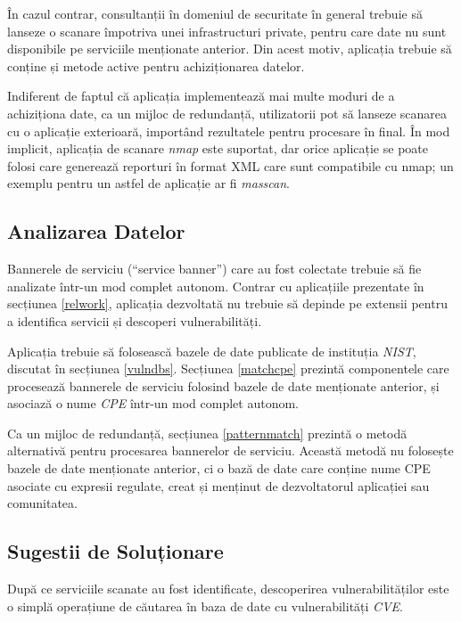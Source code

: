 	În cazul contrar, consultanții în domeniul de securitate în general trebuie să lanseze o scanare împotriva unei infrastructuri private, pentru care date nu sunt disponibile pe serviciile menționate anterior. Din acest motiv, aplicația trebuie să conține și metode active pentru achiziționarea datelor.
	
	Indiferent de faptul că aplicația implementează mai multe moduri de a achiziționa date, ca un mijloc de redundanță, utilizatorii pot să lanseze scanarea cu o aplicație exterioară, importând rezultatele pentru procesare în final. În mod implicit, aplicația de scanare \textit{nmap} este suportat, dar orice aplicație se poate folosi care generează reporturi în format XML care sunt compatibile cu nmap; un exemplu pentru un astfel de aplicație ar fi \textit{masscan}.

\subsection*{Analizarea Datelor}

	Bannerele de serviciu (``service banner'') care au fost colectate trebuie să fie analizate într-un mod complet autonom. Contrar cu aplicațiile prezentate în secțiunea \ref{relwork}, aplicația dezvoltată nu trebuie să depinde pe extensii pentru a identifica servicii și descoperi vulnerabilități.

	Aplicația trebuie să folosească bazele de date publicate de instituția \textit{NIST}, discutat în secțiunea \ref{vulndbs}. Secțiunea \ref{matchcpe} prezintă componentele care procesează bannerele de serviciu folosind bazele de date menționate anterior, și asociază o nume \textit{CPE} într-un mod complet autonom.

	Ca un mijloc de redundanță, secțiunea \ref{patternmatch} prezintă o metodă alternativă pentru procesarea bannerelor de serviciu. Această metodă nu folosește bazele de date menționate anterior, ci o bază de date care conține nume CPE asociate cu expresii regulate, creat și menținut de dezvoltatorul aplicației sau comunitatea.

\subsection*{Sugestii de Soluționare}

	După ce serviciile scanate au fost identificate, descoperirea vulnerabilităților este o simplă operațiune de căutarea în baza de date cu vulnerabilități \textit{CVE}.
	
